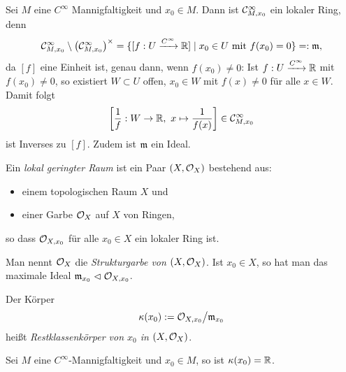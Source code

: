 \begin{beispiel}
	Sei $M$ eine $C^\infty$ Mannigfaltigkeit und $x_0 \in M$.
	Dann ist $\cal C^\infty_{M,x_0}$ ein lokaler Ring, denn
	\[
		\cal C^\infty_{M,x_0} \setminus \big(\cal C^\infty_{M,x_0}\big)^\times
		= \{[f:U\xto{C^\infty} \R] \mid x_0 \in U\text{ mit } f(x_0) = 0\}
		=: \m,
	\]
	da $[f]$ eine Einheit ist, genau dann, wenn $f(x_0) \neq 0$: 
	Ist $f: U\xto{C^\infty} \R$ mit $f(x_0) \neq 0$, so existiert
	$W\subset U$ offen, $x_0\in W$ mit $f(x) \neq 0$ für alle $x\in W$.
	Damit folgt
	\[
		\left[\frac{1}{f}: W \to \R,\ x\mapsto \frac{1}{f(x)}\right]
		\in \cal C^\infty_{M,x_0}
	\]
	ist Inverses zu $[f]$.
	Zudem ist $\m$ ein Ideal.
\end{beispiel}

\begin{definition}
	Ein \emph{lokal geringter Raum} ist ein Paar $(X, \O_X)$ bestehend aus:
	\begin{itemize}
	  \item einem topologischen Raum $X$ und
	  \item einer Garbe $\O_X$ auf $X$ von Ringen,
	\end{itemize}
	so dass $\O_{X,x_0}$ für alle $x_0\in X$ ein lokaler Ring ist.
	
	Man nennt $\O_X$ die \emph{Strukturgarbe von $(X,\O_X)$}. Ist
	$x_0\in X$, so hat man das maximale Ideal
	$\m_{x_0} \ideal \O_{X,x_0}$.
	
	Der Körper 
	\[\kappa(x_0) := \O_{X,x_0} \big/ \m_{x_0} \]
	heißt \emph{Restklassenkörper von $x_0$ in $(X,\O_X)$}.
\end{definition}

\begin{beispiel}
	Sei $M$ eine $C^\infty$-Mannigfaltigkeit und $x_0 \in M$,
	so ist $\kappa(x_0) = \R$.
\end{beispiel}

